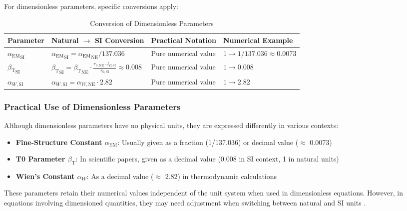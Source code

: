 \documentclass[12pt,a4paper]{article}
\newcommand{\alphaEM}{\alpha_{\text{EM}}}
\newcommand{\betaT}{\beta_{\text{T}}}
\begin{document}
	For dimensionless parameters, specific conversions apply:
	
	\begin{table}[ht]
		\centering
		\begin{adjustbox}{scale=0.85}
			\begin{tabular}{llll}
				\hline
				\textbf{Parameter} & \textbf{Natural $\to$ SI Conversion} & \textbf{Practical Notation} & \textbf{Numerical Example} \\
				\hline
				${\alphaEM}_{\text{SI}}$ & ${\alphaEM}_{\text{SI}} = {\alphaEM}_{\text{NE}}/137.036$ & Pure numerical value & $1 \to 1/137.036 \approx 0.0073$ \\
				${\betaT}_{\text{SI}}$ & ${\betaT}_{\text{SI}} = {\betaT}_{\text{NE}} \cdot \frac{r_{0,\text{NE}}\cdot l_{P,\text{SI}}}{r_{0,\text{SI}}} \approx 0.008$ & Pure numerical value & $1 \to 0.008$ \\
				$\alpha_{W,\text{SI}}$ & $\alpha_{W,\text{SI}} = \alpha_{W,\text{NE}} \cdot 2.82$ & Pure numerical value & $1 \to 2.82$ \\
				\hline
			\end{tabular}
		\end{adjustbox}
		\caption{Conversion of Dimensionless Parameters}
		\label{tab:dimensionless_conversion}
	\end{table}
	
	\subsubsection{Practical Use of Dimensionless Parameters}
	
	Although dimensionless parameters have no physical units, they are expressed differently in various contexts:
	
	\begin{itemize}
		\item \textbf{Fine-Structure Constant $\alphaEM$}: Usually given as a fraction (1/137.036) or decimal value ($\approx$ 0.0073)
		\item \textbf{T0 Parameter $\betaT$}: In scientific papers, given as a decimal value (0.008 in SI context, 1 in natural units)
		\item \textbf{Wien’s Constant $\alpha_W$}: As a decimal value ($\approx$ 2.82) in thermodynamic calculations
	\end{itemize}
	
	These parameters retain their numerical values independent of the unit system when used in dimensionless equations. However, in equations involving dimensioned quantities, they may need adjustment when switching between natural and SI units \cite{pascher_alpha_2025, pascher_beta_2025}.
	
\end{document}
